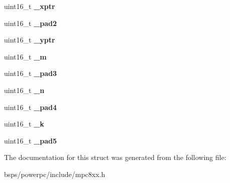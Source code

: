 \begin{DoxyCompactItemize}
\mbox{\label{structm8xxDSPparms___ab9ca61ffb392d0ac815849d9acacbf8d}} 
uint16\+\_\+t {\bfseries \+\_\+xptr}
\item 
\mbox{\label{structm8xxDSPparms___ac753f5098b6fe31ca7004dc8effb4ab0}} 
uint16\+\_\+t {\bfseries \+\_\+pad2}
\item 
\mbox{\label{structm8xxDSPparms___a06d012f0b18a12f8cdcd1efcdd746ad7}} 
uint16\+\_\+t {\bfseries \+\_\+yptr}
\item 
\mbox{\label{structm8xxDSPparms___aa192afb383d3b5e160311305f5c0d068}} 
uint16\+\_\+t {\bfseries \+\_\+m}
\item 
\mbox{\label{structm8xxDSPparms___ac562b5f13ded815ee6861ff1fea7710e}} 
uint16\+\_\+t {\bfseries \+\_\+pad3}
\item 
\mbox{\label{structm8xxDSPparms___a8247bb398e8006f00ea6fb7cf9949881}} 
uint16\+\_\+t {\bfseries \+\_\+n}
\item 
\mbox{\label{structm8xxDSPparms___a3ee3160f9a61752e783c6b61791b048d}} 
uint16\+\_\+t {\bfseries \+\_\+pad4}
\item 
\mbox{\label{structm8xxDSPparms___a65e38e5a944ea1e3f59a78515f16cb86}} 
uint16\+\_\+t {\bfseries \+\_\+k}
\item 
\mbox{\label{structm8xxDSPparms___a5e93b8fcfd64b1b9a98d48956150792d}} 
uint16\+\_\+t {\bfseries \+\_\+pad5}
\end{DoxyCompactItemize}


The documentation for this struct was generated from the following file\+:\begin{DoxyCompactItemize}
\item 
bsps/powerpc/include/mpc8xx.\+h\end{DoxyCompactItemize}
